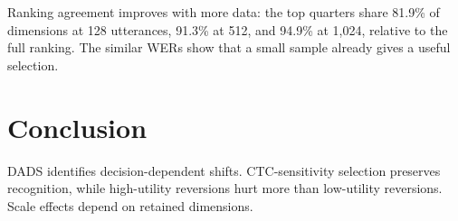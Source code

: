 \documentclass{article}
\begin{document}
\begin{table}[tb]
\centering
\caption{D0 calibration size: test WER (\%) and overlap with the full-set top quarter. Smaller sets report mean $\pm$ SD over three subsets.}
\label{tab:calibration}
\setlength{\tabcolsep}{4pt}

\end{table}

Ranking agreement improves with more data: the top quarters share 81.9\% of dimensions at 128 utterances, 91.3\% at 512, and 94.9\% at 1,024, relative to the full ranking. The similar WERs show that a small sample already gives a useful selection.

\section{Conclusion}
\label{sec:conclusion}
DADS identifies decision-dependent shifts. CTC-sensitivity selection preserves recognition, while high-utility reversions hurt more than low-utility reversions. Scale effects depend on retained dimensions.

\clearpage


\end{document}
